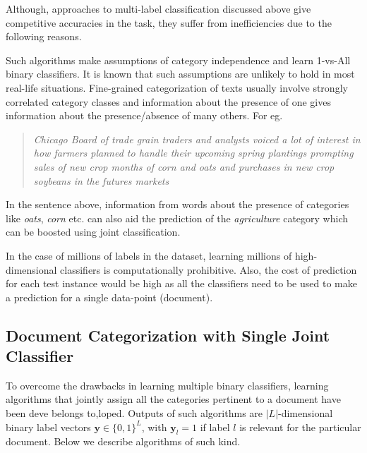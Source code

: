 \hfill 
\break
Although, approaches to multi-label classification discussed above 
give competitive accuracies in the task, they suffer from 
inefficiencies due to the following reasons.

Such algorithms make assumptions of category independence and learn 
1-vs-All binary classifiers. It is known that such assumptions are unlikely 
to hold in most real-life situations. Fine-grained 
categorization of texts usually involve strongly correlated category 
classes and information about the presence of one gives information 
about the presence/absence of many others. For eg.  
\begin{quote} 
\emph{Chicago Board of trade grain traders and analysts voiced a lot of interest in how farmers planned to handle their upcoming spring plantings prompting sales of new crop months of corn and oats and purchases in new crop soybeans in the futures markets}
\end{quote}
In the sentence above, information from words about the presence of categories like \emph{oats}, \emph{corn} etc. can also aid the prediction of the \emph{agriculture} category which can be boosted using joint classification.

In the case of millions of labels in the dataset, learning millions of high-dimensional classifiers is computationally prohibitive. Also, the cost of prediction for each test instance would be high as all the classifiers need to be used to make a prediction for a single data-point (document). 

\subsection{Document Categorization with Single Joint Classifier}
To overcome the drawbacks in learning multiple binary classifiers, 
learning algorithms that jointly assign all the categories pertinent to
a document have been deve belongs to,loped. Outputs of such algorithms are 
$|L|$-dimensional binary label vectors $\boldsymbol{y} \in \{0, 1\}^{L}$, 
with $\boldsymbol{y}_{l} = 1$ if label $l$ is relevant for the 
particular document. Below we describe algorithms of such kind.

